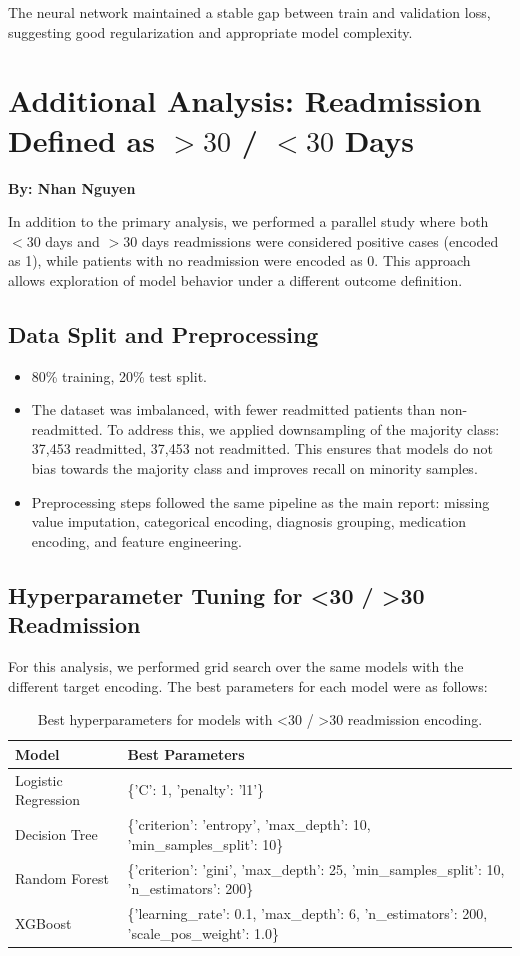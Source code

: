 \documentclass[11pt]{article}
\begin{document}
The neural network maintained a stable gap between train and validation loss, 
suggesting good regularization and appropriate model complexity.

\section{Additional Analysis: Readmission Defined as $>30$ / $ <30$  Days}
\textbf{By: Nhan Nguyen}

In addition to the primary analysis, we performed a parallel study where both $<30$ days and $>30$ days readmissions were considered positive cases (encoded as 1), while patients with no readmission were encoded as 0. This approach allows exploration of model behavior under a different outcome definition.

\subsection{Data Split and Preprocessing}
\begin{itemize}
    \item 80\% training, 20\% test split.
    \item The dataset was imbalanced, with fewer readmitted patients than non-readmitted. To address this, we applied downsampling of the majority class: 37,453 readmitted, 37,453 not readmitted. This ensures that models do not bias towards the majority class and improves recall on minority samples.
    \item Preprocessing steps followed the same pipeline as the main report: missing value imputation, categorical encoding, diagnosis grouping, medication encoding, and feature engineering.
\end{itemize}

\subsection{Hyperparameter Tuning for <30 / >30 Readmission}
For this analysis, we performed grid search over the same models with the different target encoding. The best parameters for each model were as follows:

\begin{table}[H]
\centering
\begin{tabular}{l l}
\toprule
Model & Best Parameters \\
\midrule
Logistic Regression & \{'C': 1, 'penalty': 'l1'\} \\
Decision Tree & \{'criterion': 'entropy', 'max\_depth': 10, 'min\_samples\_split': 10\} \\
Random Forest & \{'criterion': 'gini', 'max\_depth': 25, 'min\_samples\_split': 10, 'n\_estimators': 200\} \\
XGBoost & \{'learning\_rate': 0.1, 'max\_depth': 6, 'n\_estimators': 200, 'scale\_pos\_weight': 1.0\} \\
\bottomrule
\end{tabular}
\caption{Best hyperparameters for models with <30 / >30 readmission encoding.}
\end{table}
\end{document}
